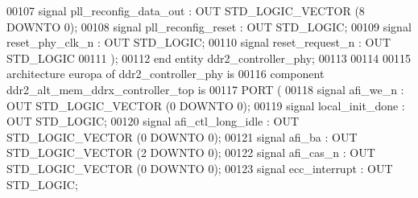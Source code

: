 \begin{DoxyCode}
00107                  \textcolor{keywordflow}{signal} \textcolor{vhdlchar}{pll_reconfig_data_out} \textcolor{vhdlchar}{:} \textcolor{keywordflow}{OUT} \textcolor{comment}{STD\_LOGIC\_VECTOR} \textcolor{vhdlchar}{(}\textcolor{vhdllogic}{}\textcolor{vhdllogic}{8} \textcolor{keywordflow}{DOWNTO} \textcolor{vhdllogic}{}\textcolor{vhdllogic}{0}\textcolor{vhdlchar}{)};
00108                  \textcolor{keywordflow}{signal} \textcolor{vhdlchar}{pll_reconfig_reset} \textcolor{vhdlchar}{:} \textcolor{keywordflow}{OUT} \textcolor{comment}{STD\_LOGIC};
00109                  \textcolor{keywordflow}{signal} \textcolor{vhdlchar}{reset_phy_clk_n} \textcolor{vhdlchar}{:} \textcolor{keywordflow}{OUT} \textcolor{comment}{STD\_LOGIC};
00110                  \textcolor{keywordflow}{signal} \textcolor{vhdlchar}{reset_request_n} \textcolor{vhdlchar}{:} \textcolor{keywordflow}{OUT} \textcolor{comment}{STD\_LOGIC}
00111               \textcolor{vhdlchar}{)};
00112 \textcolor{keywordflow}{end} \textcolor{keywordflow}{entity} \textcolor{vhdlchar}{ddr2\_controller\_phy};
00113 
00114 
00115 \textcolor{keywordflow}{architecture} europa \textcolor{keywordflow}{of} ddr2_controller_phy is
00116   \textcolor{keywordflow}{component} ddr2\_alt\_mem\_ddrx\_controller\_top \textcolor{keywordflow}{is}
00117 \textcolor{keywordflow}{PORT} (
00118     \textcolor{keywordflow}{signal} afi\_we\_n : \textcolor{keywordflow}{OUT} \textcolor{comment}{STD\_LOGIC\_VECTOR} (\textcolor{vhdllogic}{}\textcolor{vhdllogic}{0} \textcolor{keywordflow}{DOWNTO} \textcolor{vhdllogic}{}\textcolor{vhdllogic}{0});
00119         \textcolor{keywordflow}{signal} local\_init\_done : \textcolor{keywordflow}{OUT} \textcolor{comment}{STD\_LOGIC};
00120         \textcolor{keywordflow}{signal} afi\_ctl\_long\_idle : \textcolor{keywordflow}{OUT} \textcolor{comment}{STD\_LOGIC\_VECTOR} (\textcolor{vhdllogic}{}\textcolor{vhdllogic}{0} \textcolor{keywordflow}{DOWNTO} \textcolor{vhdllogic}{}\textcolor{vhdllogic}{0});
00121         \textcolor{keywordflow}{signal} afi\_ba : \textcolor{keywordflow}{OUT} \textcolor{comment}{STD\_LOGIC\_VECTOR} (\textcolor{vhdllogic}{}\textcolor{vhdllogic}{2} \textcolor{keywordflow}{DOWNTO} \textcolor{vhdllogic}{}\textcolor{vhdllogic}{0});
00122         \textcolor{keywordflow}{signal} afi\_cas\_n : \textcolor{keywordflow}{OUT} \textcolor{comment}{STD\_LOGIC\_VECTOR} (\textcolor{vhdllogic}{}\textcolor{vhdllogic}{0} \textcolor{keywordflow}{DOWNTO} \textcolor{vhdllogic}{}\textcolor{vhdllogic}{0});
00123         \textcolor{keywordflow}{signal} ecc\_interrupt : \textcolor{keywordflow}{OUT} \textcolor{comment}{STD\_LOGIC};

\end{DoxyCode}
